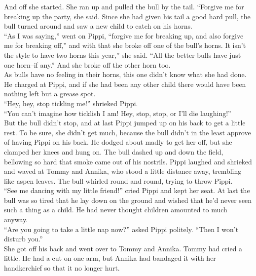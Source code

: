 \documentclass{standard}
\begin{document}
And off she started. She ran up and pulled the bull by the tail. “Forgive me for breaking up the party, she said. Since she had given his tail a good hard pull, the bull turned around and saw a new child to catch on his horns.\\

“As I was saying,” went on Pippi, “forgive me for breaking up, and also forgive me for breaking off,” and with that she broke off one of the bull’s horns. It isn’t the style to have two horns this year,” she said. “All the better bulls have just one horn--if any.” And she broke off the other horn too.\\

As bulls have no feeling in their horns, this one didn’t know what she had done. He charged at Pippi, and if she had been any other child there would have been nothing left but a grease spot.\\

“Hey, hey, stop tickling me!” shrieked Pippi.\\

“You can’t imagine how ticklish I am! Hey, stop, stop, or I’ll die laughing!”\\

But the bull didn’t stop, and at last Pippi jumped up on his back to get a little rest. To be sure, she didn’t get much, because the bull didn’t in the least approve of having Pippi on his back. He dodged about madly to get her off, but she clamped her knees and hung on. The bull dashed up and down the field, bellowing so hard that smoke came out of his nostrils. Pippi laughed and shrieked and waved at Tommy and Annika, who stood a little distance away, trembling like aspen leaves. The bull whirled round and round, trying to throw Pippi.\\

“See me dancing with my little friend!” cried Pippi and kept her seat. At last the bull was so tired that he lay down on the ground and wished that he’d never seen such a thing as a child. He had never thought children amounted to much anyway.\\

“Are you going to take a little nap now?” asked Pippi politely. “Then I won’t disturb you.”\\

She got off his back and went over to Tommy and Annika. Tommy had cried a little. He had a cut on one arm, but Annika had bandaged it with her handkerchief so that it no longer hurt.\\
\end{document}

